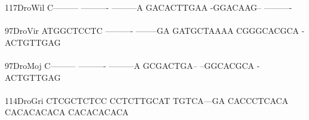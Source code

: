 \documentclass[11pt,twoside,reqno,a4paper]{article}
\begin{document}
{117\hspace*{1\charwidth}DroWil	C---------	----------	---------A	GACACTTGAA	-GGACAAG--	----------	\\
\hspace*{4\charwidth}\hspace*{7\charwidth}\hspace*{1\charwidth}\hspace*{1\charwidth}\hspace*{1\charwidth}\hspace*{1\charwidth}\hspace*{1\charwidth}\hspace*{1\charwidth}\\
97\hspace*{2\charwidth}DroVir	ATGGCTCCTC	----------	--------GA	GATGCTAAAA	CGGGCACGCA	-ACTGTTGAG	\\
\hspace*{4\charwidth}\hspace*{7\charwidth}\hspace*{1\charwidth}\hspace*{1\charwidth}\hspace*{1\charwidth}\hspace*{1\charwidth}\hspace*{1\charwidth}\hspace*{1\charwidth}\\
97\hspace*{2\charwidth}DroMoj	C---------	----------	---------A	GCGACTGA--	--GGCACGCA	-ACTGTTGAG	\\
\hspace*{4\charwidth}\hspace*{7\charwidth}\hspace*{1\charwidth}\hspace*{1\charwidth}\hspace*{1\charwidth}\hspace*{1\charwidth}\hspace*{1\charwidth}\hspace*{1\charwidth}\\
114\hspace*{1\charwidth}DroGri	CTCGCTCTCC	CCTCTTGCAT	TGTCA---GA	CACCCTCACA	CACACACACA	CACACACACA	\\
\hspace*{4\charwidth}\hspace*{7\charwidth}\hspace*{1\charwidth}\hspace*{1\charwidth}\hspace*{1\charwidth}\hspace*{1\charwidth}\hspace*{1\charwidth}\hspace*{1\charwidth}\\
}
\end{document}
